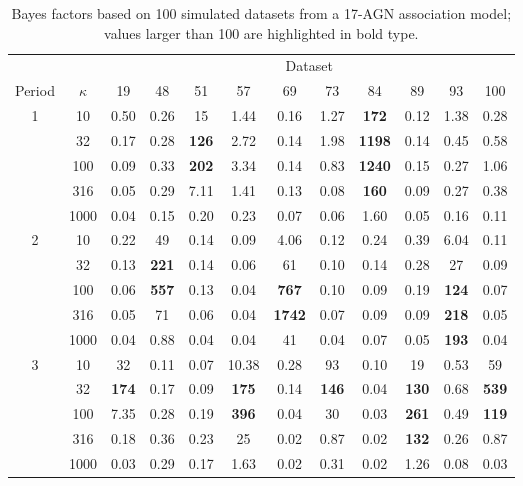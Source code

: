 \begin{table}[ht]
\begin{tabular}{|c|c |c| c| c| c|c|c|c|c|c|c|}
\hline
 & & \multicolumn{10}{|c|}{Dataset}\\
\cline{3-12}
Period & $\kappa$ & 19 & 48 & 51 & 57 & 69 & 73 & 84 & 89 & 93 & 100\\
\hline
1 & 10 & 0.50 & 0.26 & 15 & 1.44 & 0.16 & 1.27 & {\bf 172} & 0.12 & 1.38 & 0.28\\
   & 32 & 0.17 & 0.28 & {\bf 126} & 2.72 & 0.14 & 1.98 & {\bf 1198} & 0.14 & 0.45 & 0.58\\
   & 100 & 0.09& 0.33 & {\bf 202} & 3.34 & 0.14 & 0.83 & {\bf 1240} & 0.15 & 0.27 & 1.06\\
   & 316 & 0.05 & 0.29 & 7.11 & 1.41 & 0.13 & 0.08 & {\bf 160} & 0.09 & 0.27 & 0.38\\
   & 1000 & 0.04 & 0.15 & 0.20 & 0.23 & 0.07& 0.06 &  1.60 & 0.05 & 0.16 & 0.11\\
\hline
2 & 10 & 0.22 & 49 & 0.14 & 0.09 & 4.06 & 0.12 & 0.24 & 0.39 & 6.04 & 0.11\\
   & 32 & 0.13 & {\bf 221} & 0.14 & 0.06 & 61 & 0.10 & 0.14 & 0.28 & 27 & 0.09\\
   & 100 & 0.06 & {\bf 557} & 0.13 & 0.04 & {\bf 767} & 0.10 & 0.09 & 0.19 & {\bf 124} & 0.07\\
   & 316 & 0.05 & 71 & 0.06 & 0.04 & {\bf 1742} & 0.07 & 0.09 & 0.09 & {\bf 218} & 0.05\\
   & 1000& 0.04 & 0.88 & 0.04 & 0.04 & 41 & 0.04 & 0.07 & 0.05 & {\bf 193} & 0.04\\
\hline
3 & 10 & 32 & 0.11 & 0.07 & 10.38 & 0.28 & 93 & 0.10 & 19 & 0.53 & 59\\
   & 32 & {\bf 174} & 0.17 & 0.09 & {\bf 175} & 0.14 & {\bf 146} & 0.04 & {\bf 130} & 0.68 & {\bf 539}\\
   & 100 & 7.35 & 0.28 & 0.19 & {\bf 396} & 0.04 & 30 & 0.03 & {\bf 261} & 0.49 & {\bf 119}\\
   & 316 & 0.18 & 0.36 & 0.23 & 25 & 0.02 & 0.87 & 0.02 & {\bf 132} & 0.26 & 0.87\\
   & 1000 & 0.03 & 0.29 & 0.17 & 1.63 & 0.02 & 0.31 & 0.02 & 1.26 & 0.08 & 0.03\\
\hline
\end{tabular}
\caption{Bayes factors based on 100 simulated datasets from a 17-AGN association
model; values larger than 100 are highlighted in bold type.}
\label{tab:BFsim}
\end{table}
